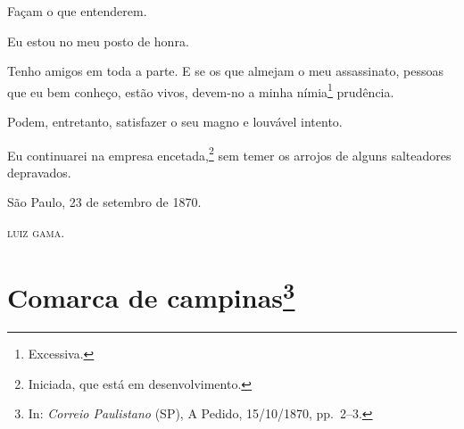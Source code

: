 {Façam o que entenderem.

Eu estou no meu posto de honra.

Tenho amigos em toda a parte. E se os que almejam o meu assassinato,
pessoas que eu bem conheço, estão vivos, devem-no a minha
nímia\footnote{ Excessiva.} prudência.

Podem, entretanto, satisfazer o seu magno e louvável intento.

Eu continuarei na empresa encetada,\footnote{ Iniciada, que está em
  desenvolvimento.} sem temer os arrojos de alguns salteadores
depravados.

\begin{flushright}
São Paulo, 23 de setembro de 1870.

\textsc{luiz gama}.
\end{flushright}
\chapter{Comarca de campinas\footnote{ In: \emph{Correio Paulistano} (SP), A Pedido, 15/10/1870,
  pp.~2--3.}} %

}
